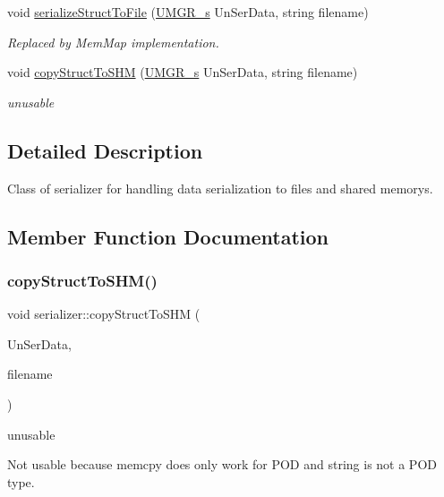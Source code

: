 \begin{DoxyCompactItemize}
void \hyperlink{classserializer_aadf6d2327ac10beefaf05ef93da36d45}{serialize\+Struct\+To\+File} (\hyperlink{structUMGR__s}{U\+M\+G\+R\+\_\+s} Un\+Ser\+Data, string filename)
\begin{DoxyCompactList}\small\item\em Replaced by Mem\+Map implementation. \end{DoxyCompactList}\item 
void \hyperlink{classserializer_ad4deb4a4d85720a5295dabc304544ac4}{copy\+Struct\+To\+S\+HM} (\hyperlink{structUMGR__s}{U\+M\+G\+R\+\_\+s} Un\+Ser\+Data, string filename)
\begin{DoxyCompactList}\small\item\em unusable \end{DoxyCompactList}\end{DoxyCompactItemize}


\subsection{Detailed Description}
Class of serializer for handling data serialization to files and shared memorys. 

\subsection{Member Function Documentation}
\mbox{\label{classserializer_ad4deb4a4d85720a5295dabc304544ac4}} 
\subsubsection{\texorpdfstring{copy\+Struct\+To\+S\+H\+M()}{copyStructToSHM()}}
{\footnotesize\ttfamily void serializer\+::copy\+Struct\+To\+S\+HM (\begin{DoxyParamCaption}\item[{\hyperlink{structUMGR__s}{U\+M\+G\+R\+\_\+s}}]{Un\+Ser\+Data,  }\item[{string}]{filename }\end{DoxyParamCaption})}



unusable 

Not usable because memcpy does only work for P\+OD and string is not a P\+OD type. \mbox{\label{classserializer_aadf6d2327ac10beefaf05ef93da36d45}} 
